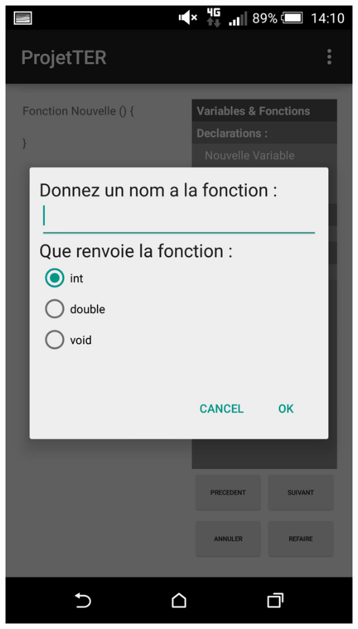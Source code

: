 \documentclass[a4paper]{article}
\begin{document}
\begin{center}
\includegraphics[scale=0.1]{img/popup_fonction.jpg}

\end{center}
\end{document}
